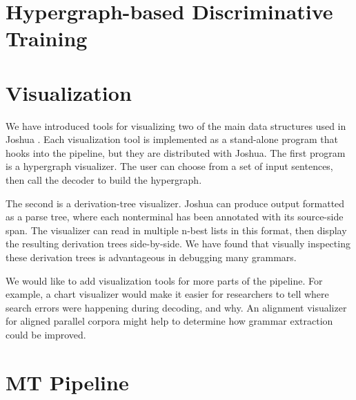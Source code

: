 \documentclass[11pt]{article}
\begin{document}
\section{Hypergraph-based Discriminative Training}

\cite{variational-decoding-acl09}
\cite{oracle-extraction-naacl09}

\section{Visualization}

We have introduced tools for visualizing two of the main data structures used
in Joshua \cite{PBML-2010-Josua-visualization}. Each visualization tool is implemented as a
stand-alone program that hooks into the pipeline, but they are distributed with
Joshua. The first program is a hypergraph visualizer. The user can choose from
a set of input sentences, then call the decoder to build the hypergraph.

The second is a derivation-tree visualizer. Joshua can produce output formatted
as a parse tree, where each nonterminal has been annotated with its source-side
span. The visualizer can read in multiple n-best lists in this format, then
display the resulting derivation trees side-by-side. We have found that
visually inspecting these derivation trees is advantageous in debugging many
grammars.

We would like to add visualization tools for more parts of the pipeline. For
example, a chart visualizer would make it easier for researchers to tell where
search errors were happening during decoding, and why. An alignment visualizer
for aligned parallel corpora might help to determine how grammar extraction 
could be improved.


\section{MT Pipeline}



\end{document}
